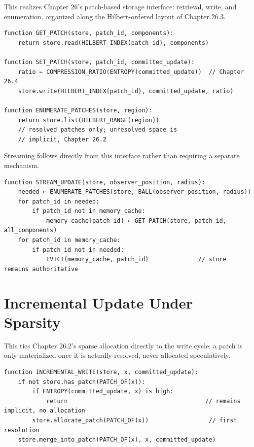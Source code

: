 This realizes Chapter 26's patch-based storage interface: retrieval, write, and enumeration, organized along the Hilbert-ordered layout of Chapter 26.3.

\begin{Verbatim}[breaklines=true, breaksymbolleft={}, fontsize=\small]
function GET_PATCH(store, patch_id, components):
    return store.read(HILBERT_INDEX(patch_id), components)

function SET_PATCH(store, patch_id, committed_update):
    ratio ← COMPRESSION_RATIO(ENTROPY(committed_update))  // Chapter 26.4
    store.write(HILBERT_INDEX(patch_id), committed_update, ratio)

function ENUMERATE_PATCHES(store, region):
    return store.list(HILBERT_RANGE(region))
    // resolved patches only; unresolved space is
    // implicit, Chapter 26.2
\end{Verbatim}

Streaming follows directly from this interface rather than requiring a separate mechanism.

\begin{Verbatim}[breaklines=true, breaksymbolleft={}, fontsize=\small]
function STREAM_UPDATE(store, observer_position, radius):
    needed ← ENUMERATE_PATCHES(store, BALL(observer_position, radius))
    for patch_id in needed:
        if patch_id not in memory_cache:
            memory_cache[patch_id] ← GET_PATCH(store, patch_id, all_components)
    for patch_id in memory_cache:
        if patch_id not in needed:
            EVICT(memory_cache, patch_id)              // store remains authoritative
\end{Verbatim}

\section{Incremental Update Under Sparsity}

This ties Chapter 26.2's sparse allocation directly to the write cycle: a patch is only materialized once it is actually resolved, never allocated speculatively.

\begin{Verbatim}[breaklines=true, breaksymbolleft={}, fontsize=\small]
function INCREMENTAL_WRITE(store, x, committed_update):
    if not store.has_patch(PATCH_OF(x)):
        if ENTROPY(committed_update, x) is high:
            return                                       // remains implicit, no allocation
        store.allocate_patch(PATCH_OF(x))                 // first resolution
    store.merge_into_patch(PATCH_OF(x), x, committed_update)
\end{Verbatim}


